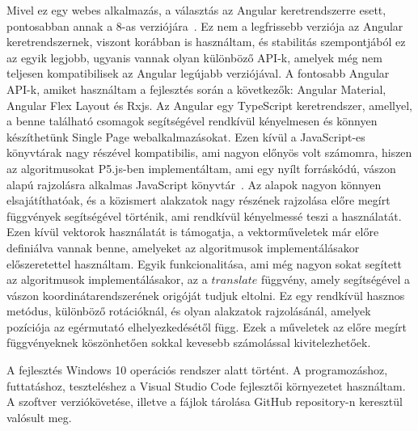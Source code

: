 Mivel ez egy webes alkalmazás, a választás az Angular keretrendszerre esett, pontosabban annak a 8-as verziójára~\cite{angular}. Ez nem a legfrissebb verziója az Angular keretrendszernek, viszont korábban is használtam, és stabilitás szempontjából ez az egyik legjobb, ugyanis vannak olyan különböző API-k, amelyek még nem teljesen kompatibilisek az Angular legújabb verziójával. A fontosabb Angular API-k, amiket használtam a fejlesztés során a következők: Angular Material, Angular Flex Layout és Rxjs. Az Angular egy TypeScript keretrendszer, amellyel, a benne található csomagok segítségével rendkívül kényelmesen és könnyen készíthetünk Single Page webalkalmazásokat. Ezen kívül a JavaScript-es könyvtárak nagy részével kompatibilis, ami nagyon előnyös volt számomra, hiszen az algoritmusokat P5.js-ben implementáltam, ami egy nyílt forráskódú, vászon alapú rajzolásra alkalmas JavaScript könyvtár~\cite{p5}. Az alapok nagyon könnyen elsajátíthatóak, és a közismert alakzatok nagy részének rajzolása előre megírt függvények segítségével történik, ami rendkívül kényelmessé teszi a használatát. Ezen kívül vektorok használatát is támogatja, a vektorműveletek már előre definiálva vannak benne, amelyeket az algoritmusok implementálásakor előszeretettel használtam. Egyik funkcionalitása, ami még nagyon sokat segített az algoritmusok implementálásakor, az a $translate$ függvény, amely segítségével a vászon koordinátarendszerének origóját tudjuk eltolni. Ez egy rendkívül hasznos metódus, különböző rotációknál, és olyan alakzatok rajzolásánál, amelyek pozíciója az egérmutató elhelyezkedésétől függ. Ezek a műveletek az előre megírt függvényeknek köszönhetően sokkal kevesebb számolással kivitelezhetőek.
\par
A fejlesztés Windows 10 operációs rendszer alatt történt. A programozáshoz, futtatáshoz, teszteléshez a Visual Studio Code fejlesztői környezetet használtam. A szoftver verziókövetése, illetve a fájlok tárolása GitHub repository-n keresztül valósult meg.
